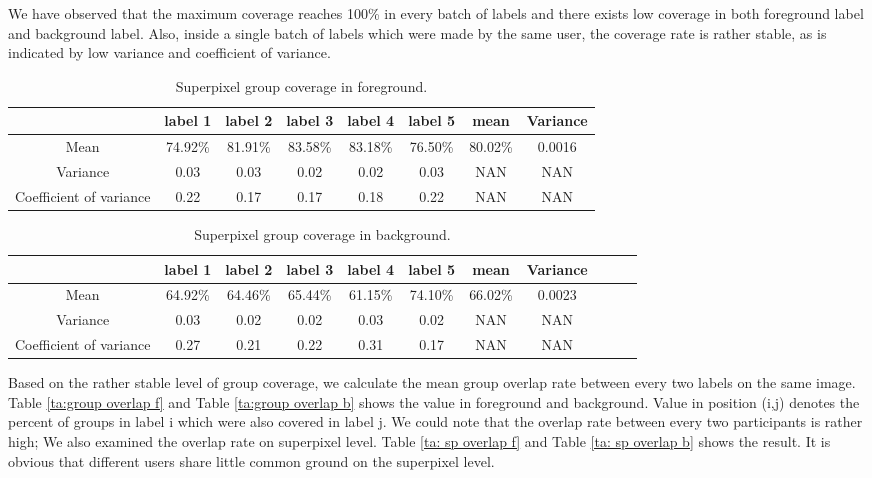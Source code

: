 \documentclass[runningheads,a4paper]{llncs}
\begin{document}
We have observed that the maximum coverage reaches 100\% in every batch of labels and there exists low coverage in both foreground label and background label. Also, inside a single batch of labels which were made by the same user, the coverage rate is rather stable, as is indicated by low variance and coefficient of variance.


\begin{table}[!tb]
\centering
\caption{Superpixel group coverage in foreground.}
\begin{tabular}{|c|c|c|c|c|c|c|c|}
\hline
 & label 1 & label 2&label 3&label 4&label 5&mean&Variance\\
\hline
Mean& 74.92\% & 81.91\% & 83.58\%& 83.18\%& 76.50\%&80.02\%&0.0016 \\
\hline
Variance& 0.03 & 0.03& 0.02& 0.02& 0.03&NAN&NAN \\
\hline
Coefficient of variance& 0.22 & 0.17 & 0.17& 0.18& 0.22&NAN&NAN \\
\hline
\end{tabular}
\label{ta: label coverage f}
\end{table}

\begin{table}[!tb]
\centering
\caption{Superpixel group coverage in background.}
\begin{tabular}{|c|c|c|c|c|c|c|c|c|c|c|}
\hline
 & label 1 & label 2&label 3&label 4&label 5&mean&Variance \\
\hline
Mean& 64.92\% & 64.46\% & 65.44\%& 61.15\%& 74.10\%&66.02\%&0.0023 \\
\hline
Variance& 0.03 & 0.02 & 0.02& 0.03& 0.02&NAN&NAN \\
\hline
Coefficient of variance& 0.27 & 0.21& 0.22& 0.31& 0.17&NAN&NAN \\
\hline
\end{tabular}
\label{ta: label coverage b}
\end{table}


Based on the rather stable level of group coverage, we calculate the mean group overlap rate between every two labels on the same image. Table \ref{ta:group overlap f} and Table \ref{ta:group overlap b}  shows the value in foreground and background. Value in position (i,j) denotes the percent of groups in label i which were also covered in label j. We could note that the overlap rate between every two participants is rather high; We also examined the overlap rate on superpixel level. Table \ref{ta: sp overlap f} and Table \ref{ta: sp overlap b} shows the result. It is obvious that different users share little common ground on the superpixel level.
\end{document}
